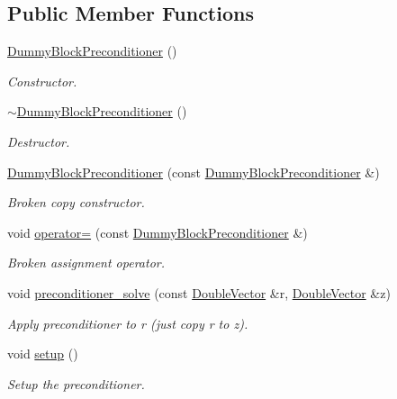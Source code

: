\subsection*{Public Member Functions}
\begin{DoxyCompactItemize}
\item 
\hyperlink{classoomph_1_1DummyBlockPreconditioner_a3b91888ef7d4216b58913bbc0eababc3}{Dummy\+Block\+Preconditioner} ()
\begin{DoxyCompactList}\small\item\em Constructor. \end{DoxyCompactList}\item 
\hyperlink{classoomph_1_1DummyBlockPreconditioner_ab979650b9f218ac3e896104d15efe3c1}{$\sim$\+Dummy\+Block\+Preconditioner} ()
\begin{DoxyCompactList}\small\item\em Destructor. \end{DoxyCompactList}\item 
\hyperlink{classoomph_1_1DummyBlockPreconditioner_a7799bc2b9fa191d25902680b301d8de3}{Dummy\+Block\+Preconditioner} (const \hyperlink{classoomph_1_1DummyBlockPreconditioner}{Dummy\+Block\+Preconditioner} \&)
\begin{DoxyCompactList}\small\item\em Broken copy constructor. \end{DoxyCompactList}\item 
void \hyperlink{classoomph_1_1DummyBlockPreconditioner_a199ba801e1e1ac6d294fd96fda009d03}{operator=} (const \hyperlink{classoomph_1_1DummyBlockPreconditioner}{Dummy\+Block\+Preconditioner} \&)
\begin{DoxyCompactList}\small\item\em Broken assignment operator. \end{DoxyCompactList}\item 
void \hyperlink{classoomph_1_1DummyBlockPreconditioner_a362eae22ec757442bf17aa2de9bc82da}{preconditioner\+\_\+solve} (const \hyperlink{classoomph_1_1DoubleVector}{Double\+Vector} \&r, \hyperlink{classoomph_1_1DoubleVector}{Double\+Vector} \&z)
\begin{DoxyCompactList}\small\item\em Apply preconditioner to r (just copy r to z). \end{DoxyCompactList}\item 
void \hyperlink{classoomph_1_1DummyBlockPreconditioner_a5bca747d99ecd5b18aef416fb6ad2c99}{setup} ()
\begin{DoxyCompactList}\small\item\em Setup the preconditioner. \end{DoxyCompactList}\end{DoxyCompactItemize}

